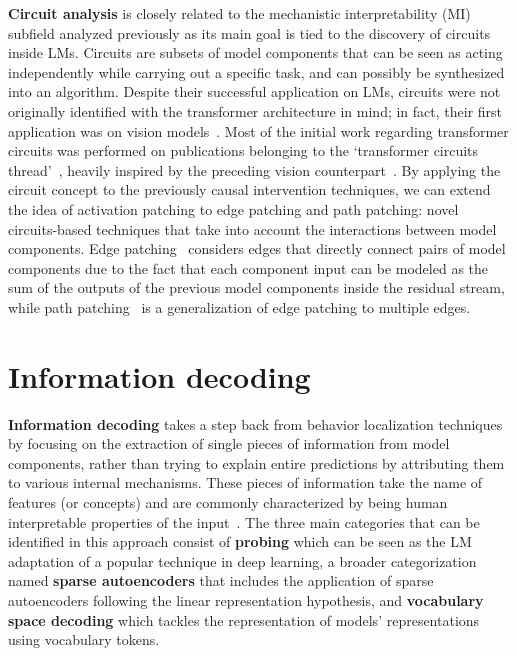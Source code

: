 \textbf{Circuit analysis} is closely related to the mechanistic interpretability (MI) subfield analyzed previously as its main goal is tied to the discovery of circuits inside LMs.
Circuits are subsets of model components that can be seen as acting independently while carrying out a specific task, and can possibly be synthesized into an algorithm.
Despite their successful application on LMs, circuits were not originally identified with the transformer architecture in mind; in fact, their first application was on vision models~\cite{cammarata2020}.
Most of the initial work regarding transformer circuits was performed on publications belonging to the `transformer circuits thread'~\cite{elhage2021,olsson2022,elhage2022,bricken2023}, heavily inspired by the preceding vision counterpart~\cite{cammarata2020}.
By applying the circuit concept to the previously causal intervention techniques, we can extend the idea of activation patching to edge patching and path patching: novel circuits-based techniques that take into account the interactions between model components.
Edge patching~\cite{li2023} considers edges that directly connect pairs of model components due to the fact that each component input can be modeled as the sum of the outputs of the previous model components inside the residual stream, while path patching~\cite{wang2023} is a generalization of edge patching to multiple edges.


\section{Information decoding}

\textbf{Information decoding} takes a step back from behavior localization techniques by focusing on the extraction of single pieces of information from model components, rather than trying to explain entire predictions by attributing them to various internal mechanisms.
These pieces of information take the name of features (or concepts) and are commonly characterized by being human interpretable properties of the input~\cite{kim2018}.
The three main categories that can be identified in this approach consist of \textbf{probing} which can be seen as the LM adaptation of a popular technique in deep learning, a broader categorization named \textbf{sparse autoencoders} that includes the application of sparse autoencoders following the linear representation hypothesis, and \textbf{vocabulary space decoding} which tackles the representation of models' representations using vocabulary tokens.

